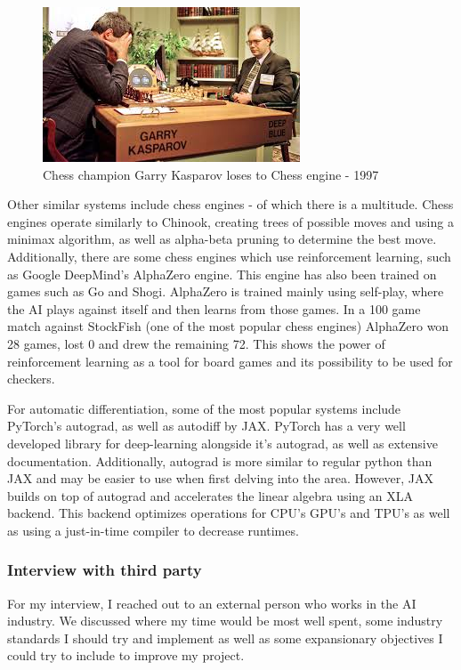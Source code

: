 \documentclass{article}
\begin{document}
    \begin{figure}
        \centering
        \includegraphics[scale=0.7]{download.jpg}
        \caption{Chess champion Garry Kasparov loses to Chess engine - 1997}
    \end{figure}
    Other similar systems include chess engines - of which there is a multitude. Chess engines operate similarly to Chinook, creating trees
    of possible moves and using a minimax algorithm, as well as alpha-beta pruning to determine the best move. Additionally, there are some
    chess engines which use reinforcement learning, such as Google DeepMind's AlphaZero engine. This engine has also been trained on games
    such as Go and Shogi. AlphaZero is trained mainly using self-play, where the AI plays against itself and then learns from those games.
    In a 100 game match against StockFish (one of the most popular chess engines) AlphaZero won 28 games, lost 0 and drew the remaining 72.
    This shows the power of reinforcement learning as a tool for board games and its possibility to be used for checkers.

    For automatic differentiation, some of the most popular systems include PyTorch's autograd, as well as autodiff by JAX. PyTorch has a very
    well developed library for deep-learning alongside it's autograd, as well as extensive documentation. Additionally, autograd is more similar
    to regular python than JAX and may be easier to use when first delving into the area. However, JAX builds on top of autograd and accelerates
    the linear algebra using an XLA backend. This backend optimizes operations for CPU's GPU's and TPU's as well as using a just-in-time compiler
    to decrease runtimes.

    \subsubsection{Interview with third party}
    For my interview, I reached out to an external person who works in the AI industry. We discussed where my time would be most well spent,
    some industry standards I should try and implement as well as some expansionary objectives I could try to include to improve my project.
\end{document}
